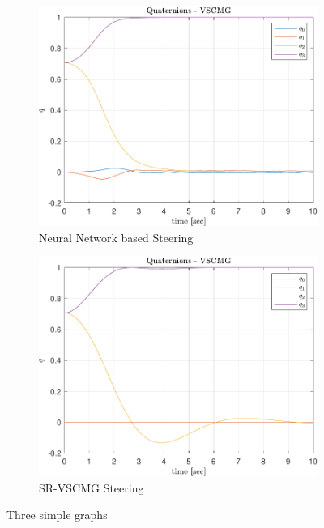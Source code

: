 \begin{figure}[ht]
     \centering
     \begin{subfigure}[b]{0.49\textwidth}
         \centering
         \includegraphics[width=\textwidth]{figures/plots/Results/vs-nn-q.pdf}
         \caption{Neural Network based Steering}
         \label{fig:y equals x}
     \end{subfigure}
     \begin{subfigure}[b]{0.49\textwidth}
         \centering
         \includegraphics[width=\textwidth]{figures/plots/Results/vs-vs-q.pdf}
         \caption{SR-VSCMG Steering}
         \label{fig:three sin x}
     \end{subfigure}
        \caption{Three simple graphs}
        \label{fig:three graphs}
\end{figure}

